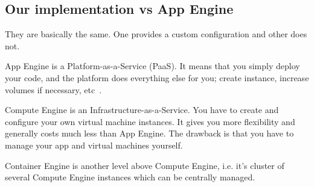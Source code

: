 \documentclass[a4paper]{article}
\begin{document}
\subsection{Our implementation vs App Engine}
They are basically the same. One provides a custom configuration and other does not.\par

App Engine is a Platform-as-a-Service (PaaS). It means that you simply deploy your code, and the platform does everything else for you; create instance, increase volumes if necessary, etc \cite{gap}.\par

Compute Engine is an Infrastructure-as-a-Service. You have to create and configure your own virtual machine instances. It gives you more flexibility and generally costs much less than App Engine. The drawback is that you have to manage your app and virtual machines yourself.\par

Container Engine is another level above Compute Engine, i.e. it's cluster of several Compute Engine instances which can be centrally managed. \cite{gcontainer}\par




\end{document}
